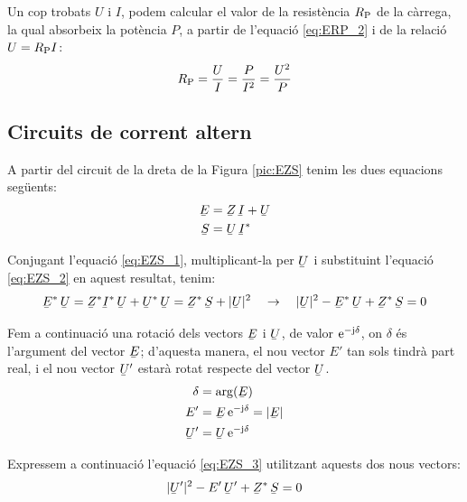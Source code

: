 Un cop trobats $U$ i $I$, podem calcular el valor de la resist\`{e}ncia
$R_\mathrm{P}$ de la c\`{a}rrega, la qual absorbeix la pot\`{e}ncia $P$, a
partir de l'equaci\'{o} \eqref{eq:ERP_2} i de la relaci\'{o} $U =R_\mathrm{P}
I$:
\begin{equation}
   R_\mathrm{P} = \frac{U}{I} = \frac{P}{I^2} = \frac{U^2}{P}
\end{equation}

\subsection{Circuits de corrent altern}

A partir del circuit de la dreta de la Figura \vref{pic:EZS} tenim les dues equacions seg\"{u}ents:
\begin{align}
   \cmplx{E} &= \cmplx{Z} \, \cmplx{I} + \cmplx{U} \label{eq:EZS_1} \\
   \cmplx{S} &= \cmplx{U} \, \cmplx{I}^*           \label{eq:EZS_2}
\end{align}

Conjugant l'equaci\'{o} \eqref{eq:EZS_1}, multiplicant-la per $\cmplx{U}$ i substituint l'equaci\'{o} \eqref{eq:EZS_2} en aquest resultat, tenim:
\begin{equation}
   \cmplx{E}^* \, \cmplx{U} = \cmplx{Z}^* \cmplx{I}^* \, \cmplx{U} + \cmplx{U}^* \, \cmplx{U} =
   \cmplx{Z}^* \, \cmplx{S} + |\cmplx{U}|^2 \quad \rightarrow \quad
   |\cmplx{U}|^2 - \cmplx{E}^* \, \cmplx{U} + \cmplx{Z}^* \, \cmplx{S} = 0
   \label{eq:EZS_3}
\end{equation}

Fem a continuaci\'{o} una rotaci\'{o} dels vectors $\cmplx{E}$ i
$\cmplx{U}$, de valor $\mathrm{e}^{-\mathrm{j}\delta}$, on $\delta$ \'{e}s l'argument
del vector $\cmplx{E}$; d'aquesta manera, el nou vector $E'$ tan
sols tindr\`{a} part real, i el nou vector $\cmplx{U}'$ estar\`{a} rotat
respecte del vector $\cmplx{U}$.
\begin{align}
   \delta &= \arg(\cmplx{E}) \label{eq:EZS_9} \\
   E' &= \cmplx{E} \, \eu^{-\ju\delta} = |\cmplx{E}|  \label{eq:EZS_4} \\
   \cmplx{U}' &= \cmplx{U} \, \eu^{-\ju\delta}   \label{eq:EZS_5}
\end{align}

Expressem a continuaci\'{o} l'equaci\'{o} \eqref{eq:EZS_3} utilitzant
aquests dos nous vectors:
\begin{equation}
   |\cmplx{U}'|^2 - E' \, \cmplx{U}' + \cmplx{Z}^* \, \cmplx{S} = 0 \label{eq:EZS_6}
\end{equation}


